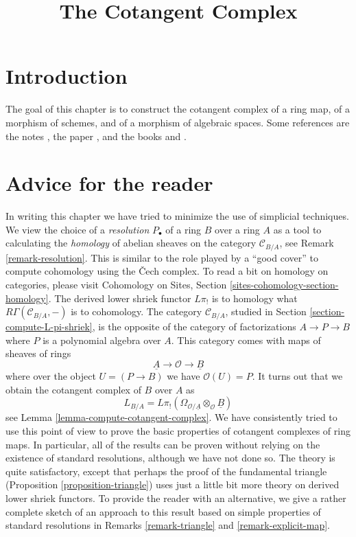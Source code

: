 \documentclass{stacks-project}
\theoremstyle{plain}
\theoremstyle{definition}
\theoremstyle{remark}
\numberwithin{equation}{subsection}
\begin{document}
\title{The Cotangent Complex}


\maketitle

\label{section-phantom}

\tableofcontents

\section{Introduction}
\label{section-introduction}

\noindent
The goal of this chapter is to construct the cotangent complex of a
ring map, of a morphism of schemes, and of a morphism of algebraic spaces.
Some references are the notes \cite{quillenhomology}, the paper
\cite{quillencohomology}, and the books
\cite{Andre} and \cite{cotangent}.




\section{Advice for the reader}
\label{section-advice-reader}

\noindent
In writing this chapter we have tried to minimize
the use of simplicial techniques. We view the choice of a {\it resolution}
$P_\bullet$ of a ring $B$ over a ring $A$ as a tool to calculating the
{\it homology} of abelian sheaves on the category $\mathcal{C}_{B/A}$, see
Remark \ref{remark-resolution}. This is similar to the role played
by a ``good cover'' to compute cohomology using the {\v C}ech complex.
To read a bit on homology on categories, please visit
Cohomology on Sites, Section \ref{sites-cohomology-section-homology}.
The derived lower shriek functor $L\pi_!$ is to homology what
$R\Gamma(\mathcal{C}_{B/A}, -)$ is to cohomology. The category
$\mathcal{C}_{B/A}$, studied in Section \ref{section-compute-L-pi-shriek},
is the opposite of the category of factorizations $A \to P \to B$ where $P$
is a polynomial algebra over $A$. This category comes with maps of sheaves
of rings
$$
\underline{A} \longrightarrow \mathcal{O} \longrightarrow \underline{B}
$$
where over the object $U =  (P \to B)$ we have $\mathcal{O}(U) = P$. 
It turns out that we obtain the cotangent complex of $B$ over $A$ as
$$
L_{B/A} =
L\pi_!(\Omega_{\mathcal{O}/\underline{A}} \otimes_\mathcal{O} \underline{B})
$$
see Lemma \ref{lemma-compute-cotangent-complex}. We have consistently tried
to use this point of view to prove the basic properties of cotangent
complexes of ring maps. In particular, all of the results can be proven
without relying on the existence of standard resolutions, although we have
not done so. The theory is quite satisfactory, except that
perhaps the proof of the fundamental triangle
(Proposition \ref{proposition-triangle}) uses just a little
bit more theory on derived lower shriek functors.
To provide the reader with an alternative,
we give a rather complete sketch of an approach to this result
based on simple properties of standard resolutions in
Remarks \ref{remark-triangle} and \ref{remark-explicit-map}.
\end{document}
